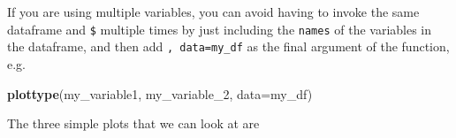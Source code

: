 \documentclass[]{book}
\newenvironment{Shaded}{\begin{snugshade}}{\end{snugshade}}
\newcommand{\KeywordTok}[1]{\textcolor[rgb]{0.13,0.29,0.53}{\textbf{#1}}}
\newcommand{\DataTypeTok}[1]{\textcolor[rgb]{0.13,0.29,0.53}{#1}}
\newcommand{\DecValTok}[1]{\textcolor[rgb]{0.00,0.00,0.81}{#1}}
\newcommand{\OperatorTok}[1]{\textcolor[rgb]{0.81,0.36,0.00}{\textbf{#1}}}
\newcommand{\NormalTok}[1]{#1}
\theoremstyle{definition}
\theoremstyle{definition}
\theoremstyle{definition}
\theoremstyle{remark}
\begin{document}
\begin{Shaded}
\end{Shaded}

If you are using multiple variables, you can avoid having to invoke the
same dataframe and \texttt{\$} multiple times by just including the
\texttt{names} of the variables in the dataframe, and then add
\texttt{,\ data=my\_df} as the final argument of the function, e.g.

\begin{Shaded}
\begin{Highlighting}[]
\KeywordTok{plottype}\NormalTok{(my_variable1, my_variable_}\DecValTok{2}\NormalTok{, }\DataTypeTok{data=}\NormalTok{my_df)}
\end{Highlighting}
\end{Shaded}

The three simple plots that we can look at are
\end{document}
